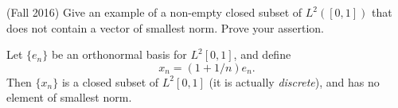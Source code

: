 \documentclass{exam}
\theoremstyle{problemstyle}
\newcommand{\vt}{\vskip 5mm} %
\newcommand{\norm}[1]{\left\lVert#1\right\rVert} %
\newcommand{\1}[1]{\textbf{1}_{\left[#1\right]}} %
\begin{document}
\begin{questions}
\item (Fall 2016)
  Give an example of a non-empty closed subset of $L^{2}([0,1])$ that does not contain a vector of smallest norm. Prove your assertion.

\begin{solution}
	Let $\{ e_n \}$ be an orthonormal basis for $L^2[0,1]$, and define
	\[ x_n = (1 + 1/n) e_n. \]
	Then $\{ x_n \}$ is a closed subset of $L^2[0,1]$ (it is actually \emph{discrete}), and has no element of smallest norm.

\begin{comment}
  Let $e_{n} = \sqrt{2}\sin(n\pi x)$ for $n=1,2,\ldots$, and define $x_{n}= \left(\frac{n+1}{n}\right)e_{n}$. Then $\{x_{n}\}_{n=1}$ is a nonempty closed subset with no element of smallest norm. To prove this, we first prove two claims:

  

  \vt
  \noindent \textit{Claim 1:} $\{e_{n}\}_{n\geq 1}$ is an orthonormal set in $L^{2}([0,1])$.
  \begin{proof}[Proof of Claim 1:]
    Need to show two things: (1) that $\norm{e_{n}}_{L^{2}([0,1])}=1$ for all $n$, and (2) that $\langle e_{n},e_{m}\rangle$ whenever $m\neq n$. These can be shown by direct computation using trig identities:

    Suppose $n\geq 1$. Then using $\sin^{2}(\theta) = \frac{1}{2}\left( 1-\cos(2\theta) \right)$,

    \begin{equation*}
      \norm{e_{n}}_{L^{2}([0,1])}^{2} = \int_{0}^{1}2\sin^{2}(n\pi x)dx = \int_{0}^{1}1-\cos(n\pi x)dx=1.
    \end{equation*}
    This proves (1).
    Next, suppose $m\neq n$. Using $\sin(A)\sin(B) = \frac{1}{2}\left(\cos(A-B)-\cos(A+B)  \right)$,
    \begin{align*}
      \langle e_{n},e_{m}\rangle
      &= \int_{0}^{1}2\sin(n\pi x)\sin(m\pi x)dx\\
      &= \int_{0}^{1} \cos((n-m)\pi x) - \cos((n+m)\pi x)dx\\
      &=0.
    \end{align*}
    This proves (2), which completes the proof of the claim.
  \end{proof}


\end{comment}
\end{solution}
\end{questions}
\end{document}
